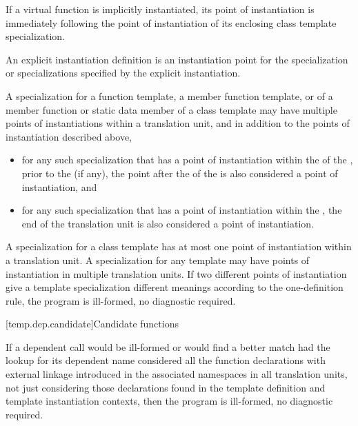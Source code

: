 \pnum
If a virtual function is implicitly instantiated, its point of instantiation
is immediately following the point of instantiation of its enclosing class
template specialization.

\pnum
An explicit instantiation definition is an instantiation
point for the specialization or specializations specified by the explicit
instantiation.

\pnum
A specialization for a function template, a member function template,
or of a member function or static data member of a class template may have
multiple points of instantiations within a translation unit, and in addition
to the points of instantiation described above,
\begin{itemize}
\item
for any such
specialization that has a point of instantiation within the
 of the
,
prior to the  (if any),
the point after the 
of the 
is also considered a point of instantiation,
and
\item
for any such specialization that has a point of instantiation
within the ,
the end of the translation unit is also
considered a point of instantiation.
\end{itemize}
A specialization for a class template has at most one point of instantiation
within a translation unit.
A specialization for any template may have points of instantiation in multiple
translation units.
If two different points of instantiation give a template specialization
different meanings according to the one-definition rule,
the program is ill-formed, no diagnostic required.

[temp.dep.candidate]{Candidate functions}

\pnum
{}%
If a dependent call would be ill-formed or
would find a better match had the lookup for its dependent name
considered all the function declarations with external linkage
introduced in the associated namespaces in all translation units,
not just considering those declarations found in the template definition and
template instantiation contexts,
then the program is ill-formed, no diagnostic required.

